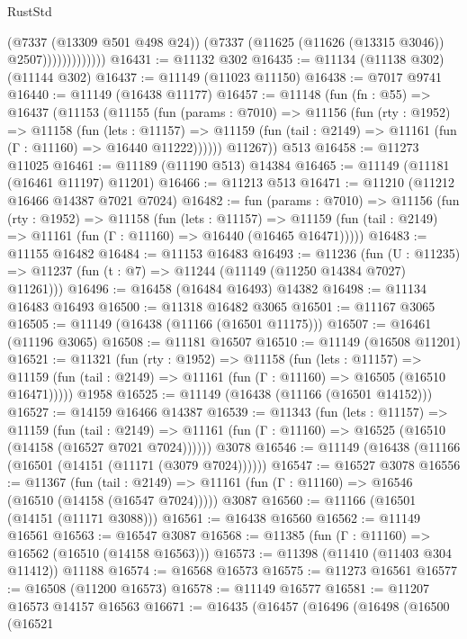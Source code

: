 \begin{lexlean}{RustStd}
\begin{coremodule}
                          (@7337 (@13309 @501 @498 @24))
                          (@7337 (@11625 (@11626 (@13315 @3046)) @2507)))))))))))))
@16431 := @11132 @302
@16435 := @11134 (@11138 @302) (@11144 @302)
@16437 := @11149 (@11023 @11150)
@16438 := @7017 @9741
@16440 := @11149 (@16438 @11177)
@16457 := @11148
    (fun (fn : @55) =>
    @16437
      (@11153
        (@11155
          (fun (params : @7010) =>
          @11156
            (fun (rty : @1952) =>
            @11158
              (fun (lets : @11157) =>
              @11159 (fun (tail : @2149) => @11161 (fun (Γ : @11160) => @16440 @11222))))))
        @11267))
    @513
@16458 := @11273 @11025
@16461 := @11189 (@11190 @513) @14384
@16465 := @11149 (@11181 (@16461 @11197) @11201)
@16466 := @11213 @513
@16471 := @11210 (@11212 @16466 @14387 @7021 @7024)
@16482 := fun (params : @7010) =>
  @11156
    (fun (rty : @1952) =>
    @11158
      (fun (lets : @11157) =>
      @11159 (fun (tail : @2149) => @11161 (fun (Γ : @11160) => @16440 (@16465 @16471)))))
@16483 := @11155 @16482
@16484 := @11153 @16483
@16493 := @11236
    (fun (U : @11235) => @11237 (fun (t : @7) => @11244 (@11149 (@11250 @14384 @7027) @11261)))
@16496 := @16458 (@16484 @16493) @14382
@16498 := @11134 @16483 @16493
@16500 := @11318 @16482 @3065
@16501 := @11167 @3065
@16505 := @11149 (@16438 (@11166 (@16501 @11175)))
@16507 := @16461 (@11196 @3065)
@16508 := @11181 @16507
@16510 := @11149 (@16508 @11201)
@16521 := @11321
    (fun (rty : @1952) =>
    @11158
      (fun (lets : @11157) =>
      @11159 (fun (tail : @2149) => @11161 (fun (Γ : @11160) => @16505 (@16510 @16471)))))
    @1958
@16525 := @11149 (@16438 (@11166 (@16501 @14152)))
@16527 := @14159 @16466 @14387
@16539 := @11343
    (fun (lets : @11157) =>
    @11159
      (fun (tail : @2149) =>
      @11161 (fun (Γ : @11160) => @16525 (@16510 (@14158 (@16527 @7021 @7024))))))
    @3078
@16546 := @11149 (@16438 (@11166 (@16501 (@14151 (@11171 (@3079 @7024))))))
@16547 := @16527 @3078
@16556 := @11367
    (fun (tail : @2149) => @11161 (fun (Γ : @11160) => @16546 (@16510 (@14158 (@16547 @7024)))))
    @3087
@16560 := @11166 (@16501 (@14151 (@11171 @3088)))
@16561 := @16438 @16560
@16562 := @11149 @16561
@16563 := @16547 @3087
@16568 := @11385 (fun (Γ : @11160) => @16562 (@16510 (@14158 @16563)))
@16573 := @11398 (@11410 (@11403 @304 @11412)) @11188
@16574 := @16568 @16573
@16575 := @11273 @16561
@16577 := @16508 (@11200 @16573)
@16578 := @11149 @16577
@16581 := @11207 @16573 @14157 @16563
@16671 := @16435
    (@16457
      (@16496
        (@16498
          (@16500
            (@16521

\end{coremodule}
\end{lexlean}
